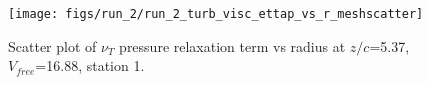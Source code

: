 \begin{figure}[H]
\centering
\texttt{[image: figs/run\_2/run\_2\_turb\_visc\_ettap\_vs\_r\_meshscatter]}
\caption{Scatter plot of $\nu_T$ pressure relaxation term vs radius at $z/c$=5.37, $V_{free}$=16.88, station 1.}
\label{fig:run_2_turb_visc_ettap_vs_r_meshscatter}
\end{figure}


